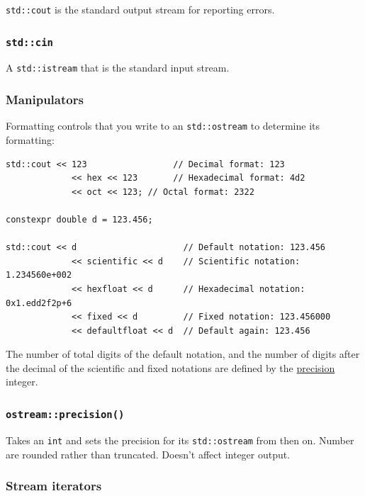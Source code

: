 \documentclass[table, xcdraw]{article}%
\begin{document}
\texttt{std::cout} is the standard output stream for reporting errors.

\subsubsection{\texttt{std::cin}}

A \texttt{std::istream} that is the standard input stream.

\subsubsection{Manipulators} \label{manipulators}

Formatting controls that you write to an \texttt{std::ostream} to determine its formatting:

\begin{verbatim}
std::cout << 123                 // Decimal format: 123
             << hex << 123       // Hexadecimal format: 4d2
             << oct << 123; // Octal format: 2322
          
constexpr double d = 123.456;

std::cout << d                     // Default notation: 123.456
             << scientific << d    // Scientific notation: 1.234560e+002
             << hexfloat << d      // Hexadecimal notation: 0x1.edd2f2p+6
             << fixed << d         // Fixed notation: 123.456000
             << defaultfloat << d  // Default again: 123.456
\end{verbatim}

The number of total digits of the  default notation, and the number of digits after the decimal of the scientific and fixed notations are defined by the \hyperref[precision]{precision} integer.

\subsubsection{\texttt{ostream::precision()}} \label{precision}

Takes an \texttt{int} and sets the precision for its \texttt{std::ostream} from then on. Number are rounded rather than truncated. Doesn't affect integer output.

\subsubsection{Stream iterators} \label{stream_iterators}
\end{document}
